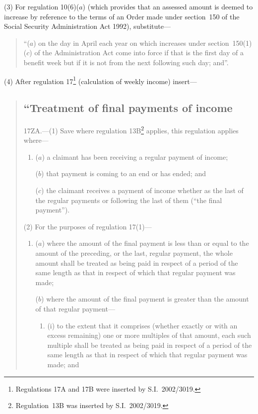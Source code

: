 \documentclass[12pt,a4paper]{article}
\begin{document}
(3) For regulation 10(6)($a$)  (which provides that an assessed amount is deemed to increase by reference to the terms of an Order made under section~150 of the Social Security Administration Act 1992), substitute—
\begin{quotation}
“($a$) on the day in April each year on which increases under section~150(1)($c$)  of the Administration Act come into force if that is the first day of a benefit week but if it is not from the next following such day; and”.
\end{quotation}

(4) After regulation 17\footnote{Regulations 17A and 17B were inserted by S.I.~2002/3019.} (calculation of weekly income) insert—
\begin{quotation}
\subsection*{“Treatment of final payments of income}

17ZA.---(1)  Save where regulation 13B\footnote{Regulation~13B was inserted by S.I.~2002/3019.} applies, this regulation applies where—
\begin{enumerate}\item[]
($a$) a claimant has been receiving a regular payment of income;

($b$) that payment is coming to an end or has ended; and

($c$) the claimant receives a payment of income whether as the last of the regular payments or following the last of them (“the final payment”).
\end{enumerate}

(2) For the purposes of regulation 17(1)—
\begin{enumerate}\item[]
($a$) where the amount of the final payment is less than or equal to the amount of the preceding, or the last, regular payment, the whole amount shall be treated as being paid in respect of a period of the same length as that in respect of which that regular payment was made;

($b$) where the amount of the final payment is greater than the amount of that regular payment—
\begin{enumerate}\item[]
(i) to the extent that it comprises (whether exactly or with an excess remaining) one or more multiples of that amount, each such multiple shall be treated as being paid in respect of a period of the same length as that in respect of which that regular payment was made; and


\end{enumerate}
\end{enumerate}
\end{quotation}
\end{document}
